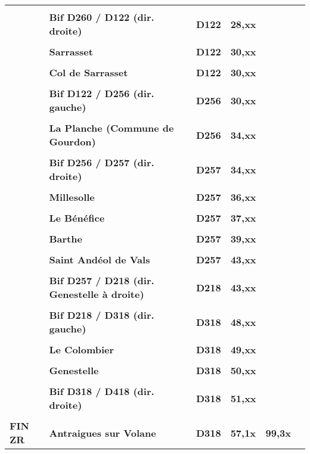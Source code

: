 \documentclass{article}%
\begin{document}
\begin{longtable}{p{2.25cm}|p{6.7cm}|p{2.0cm}|p{1.5cm}|p{1.5cm}|p{3.5cm}}
 & & & & & \\%
 &\textbf{Bif D260 / D122 (dir. droite)}&\textbf{D122}&\textbf{28,xx}& & \\%
 & & & & & \\%
 &\textbf{Sarrasset}&\textbf{D122}&\textbf{30,xx}& & \\%
 & & & & & \\%
 &\textbf{Col de Sarrasset}&\textbf{D122}&\textbf{30,xx}& & \\%
 & & & & & \\%
 &\textbf{Bif D122 / D256 (dir. gauche)}&\textbf{D256}&\textbf{30,xx}& & \\%
 & & & & & \\%
 &\textbf{La Planche (Commune de Gourdon)}&\textbf{D256}&\textbf{34,xx}& & \\%
 & & & & & \\%
 &\textbf{Bif D256 / D257 (dir. droite)}&\textbf{D257}&\textbf{34,xx}& & \\%
 & & & & & \\%
 &\textbf{Millesolle}&\textbf{D257}&\textbf{36,xx}& & \\%
 & & & & & \\%
 &\textbf{Le Bénéfice}&\textbf{D257}&\textbf{37,xx}& & \\%
 & & & & & \\%
 &\textbf{Barthe}&\textbf{D257}&\textbf{39,xx}& & \\%
 & & & & & \\%
 &\textbf{Saint Andéol de Vals}&\textbf{D257}&\textbf{43,xx}& & \\%
 & & & & & \\%
 &\textbf{Bif D257 / D218 (dir. Genestelle à droite)}&\textbf{D218}&\textbf{43,xx}& & \\%
 & & & & & \\%
 &\textbf{Bif D218 / D318 (dir. gauche)}&\textbf{D318}&\textbf{48,xx}& & \\%
 & & & & & \\%
 &\textbf{Le Colombier}&\textbf{D318}&\textbf{49,xx}& & \\%
 & & & & & \\%
 &\textbf{Genestelle }&\textbf{D318}&\textbf{50,xx}& & \\%
 & & & & & \\%
 &\textbf{Bif D318 / D418 (dir. droite)}&\textbf{D318 }&\textbf{51,xx}& & \\%
 & & & & & \\%
\textbf{FIN ZR}&\textbf{Antraigues sur Volane }&\textbf{D318}&\textbf{57,1x}&\textbf{99,3x}& \\%

\end{longtable}
\end{document}
